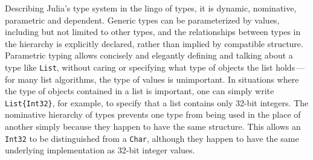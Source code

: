 \documentclass{article}
\begin{document}
Describing Julia's type system in the lingo of types, it is dynamic, nominative, parametric and dependent.
Generic types can be parameterized by values, including but not limited to other types, and the relationships between types in the hierarchy is explicitly declared, rather than implied by compatible structure.
Parametric typing allows concisely and elegantly defining and talking about a type like \verb|List|, without caring or specifying what type of objects the list holds\,---\,for many list algorithms, the type of values is unimportant.
In situations where the type of objects contained in a list is important, one can simply write \verb|List{Int32}|, for example, to specify that a list contains only 32-bit integers.
The nominative hierarchy of types prevents one type from being used in the place of another simply because they happen to have the same structure.
This allows an \verb|Int32| to be distinguished from a \verb|Char|, although they happen to have the same underlying implementation as 32-bit integer values.
\end{document}

